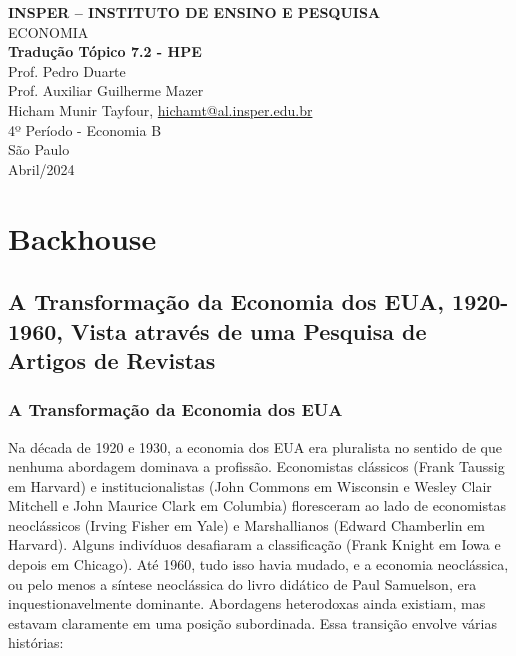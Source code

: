 \documentclass[12pt]{article}
\begin{document}
\begin{titlepage}
    \centering
    \vspace*{1cm}
    \Large\textbf{INSPER – INSTITUTO DE ENSINO E PESQUISA}\\
    \Large ECONOMIA\\
    \vspace{1.5cm}
    \Large\textbf{Tradução Tópico 7.2 - HPE}\\
    \vspace{1.5cm}
    Prof. Pedro Duarte\\
    Prof. Auxiliar Guilherme Mazer\\
    \vfill
    \normalsize
    Hicham Munir Tayfour, \href{mailto:hichamt@al.insper.edu.br}{hichamt@al.insper.edu.br}\\
    4º Período - Economia B\\
    \vfill
    São Paulo\\
    Abril/2024
\end{titlepage}

\newpage
\tableofcontents
\thispagestyle{empty} %
\newpage
\setcounter{page}{1} %
\justify
\onehalfspacing

\pagestyle{fancy}
\fancyhf{}
\rhead{\thepage}

\section{\textbf{Backhouse}}

\subsection{\textbf{A Transformação da Economia dos EUA, 1920-1960, Vista através de uma Pesquisa de Artigos de Revistas}}

\subsubsection{\textbf{A Transformação da Economia dos EUA}}

Na década de 1920 e 1930, a economia dos EUA era pluralista no sentido de que nenhuma abordagem dominava a profissão. Economistas clássicos (Frank Taussig em Harvard) e institucionalistas (John Commons em Wisconsin e Wesley Clair Mitchell e John Maurice Clark em Columbia) floresceram ao lado de economistas neoclássicos (Irving Fisher em Yale) e Marshallianos (Edward Chamberlin em Harvard). Alguns indivíduos desafiaram a classificação (Frank Knight em Iowa e depois em Chicago). Até 1960, tudo isso havia mudado, e a economia neoclássica, ou pelo menos a síntese neoclássica do livro didático de Paul Samuelson, era inquestionavelmente dominante. Abordagens heterodoxas ainda existiam, mas estavam claramente em uma posição subordinada. Essa transição envolve várias histórias:
\end{document}

